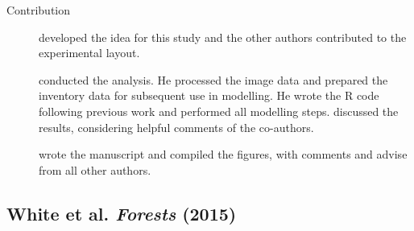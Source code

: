 \begin{description}
	\item[Contribution] \myName developed the idea for this study and the other authors contributed to the experimental layout. 
	
		\myName conducted the analysis. He processed the image data and prepared the inventory data for subsequent use in modelling. 
		He wrote the \textsf{R} code following previous work \parencite{Stepper.2015b} and performed all modelling steps. 
		\myName discussed the results, considering helpful comments of the co-authors. 
		
		\myName wrote the manuscript and compiled the figures, with comments and advise from all other authors. 
	
\end{description}



\subsection[White et al. \emph{Forests} (2015)]
{White et al.\; 
	\emph{Forests}
	(2015) }
\label{sec:pub.Forests2015}

